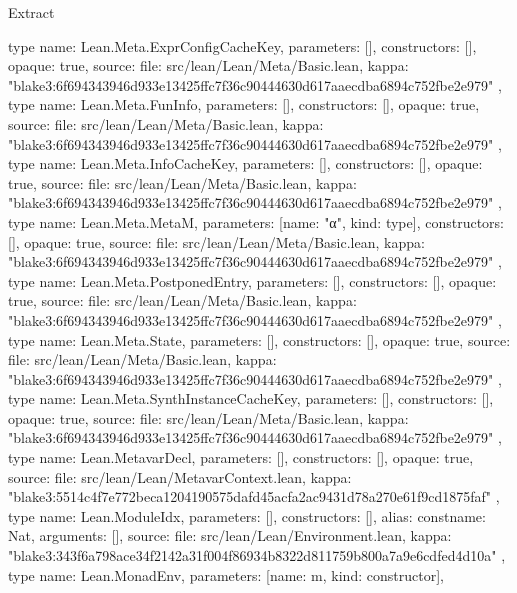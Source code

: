 \begin{lexlean}{Extract}
\begin{toolingmodule}
{    type{
      name: Lean.Meta.ExprConfigCacheKey,
      parameters: [],
      constructors: [],
      opaque: true,
      source: {
        file: src/lean/Lean/Meta/Basic.lean,
        kappa: "blake3:6f694343946d933e13425ffc7f36c90444630d617aaecdba6894c752fbe2e979"
      }
    },
    type{
      name: Lean.Meta.FunInfo,
      parameters: [],
      constructors: [],
      opaque: true,
      source: {
        file: src/lean/Lean/Meta/Basic.lean,
        kappa: "blake3:6f694343946d933e13425ffc7f36c90444630d617aaecdba6894c752fbe2e979"
      }
    },
    type{
      name: Lean.Meta.InfoCacheKey,
      parameters: [],
      constructors: [],
      opaque: true,
      source: {
        file: src/lean/Lean/Meta/Basic.lean,
        kappa: "blake3:6f694343946d933e13425ffc7f36c90444630d617aaecdba6894c752fbe2e979"
      }
    },
    type{
      name: Lean.Meta.MetaM,
      parameters: [{name: "α", kind: type{}}],
      constructors: [],
      opaque: true,
      source: {
        file: src/lean/Lean/Meta/Basic.lean,
        kappa: "blake3:6f694343946d933e13425ffc7f36c90444630d617aaecdba6894c752fbe2e979"
      }
    },
    type{
      name: Lean.Meta.PostponedEntry,
      parameters: [],
      constructors: [],
      opaque: true,
      source: {
        file: src/lean/Lean/Meta/Basic.lean,
        kappa: "blake3:6f694343946d933e13425ffc7f36c90444630d617aaecdba6894c752fbe2e979"
      }
    },
    type{
      name: Lean.Meta.State,
      parameters: [],
      constructors: [],
      opaque: true,
      source: {
        file: src/lean/Lean/Meta/Basic.lean,
        kappa: "blake3:6f694343946d933e13425ffc7f36c90444630d617aaecdba6894c752fbe2e979"
      }
    },
    type{
      name: Lean.Meta.SynthInstanceCacheKey,
      parameters: [],
      constructors: [],
      opaque: true,
      source: {
        file: src/lean/Lean/Meta/Basic.lean,
        kappa: "blake3:6f694343946d933e13425ffc7f36c90444630d617aaecdba6894c752fbe2e979"
      }
    },
    type{
      name: Lean.MetavarDecl,
      parameters: [],
      constructors: [],
      opaque: true,
      source: {
        file: src/lean/Lean/MetavarContext.lean,
        kappa: "blake3:5514c4f7e772beca1204190575dafd45acfa2ac9431d78a270e61f9cd1875faf"
      }
    },
    type{
      name: Lean.ModuleIdx,
      parameters: [],
      constructors: [],
      alias: const{name: Nat, arguments: []},
      source: {
        file: src/lean/Lean/Environment.lean,
        kappa: "blake3:343f6a798ace34f2142a31f004f86934b8322d811759b800a7a9e6cdfed4d10a"
      }
    },
    type{
      name: Lean.MonadEnv,
      parameters: [{name: m, kind: constructor{}}],
}}
\end{toolingmodule}
\end{lexlean}
